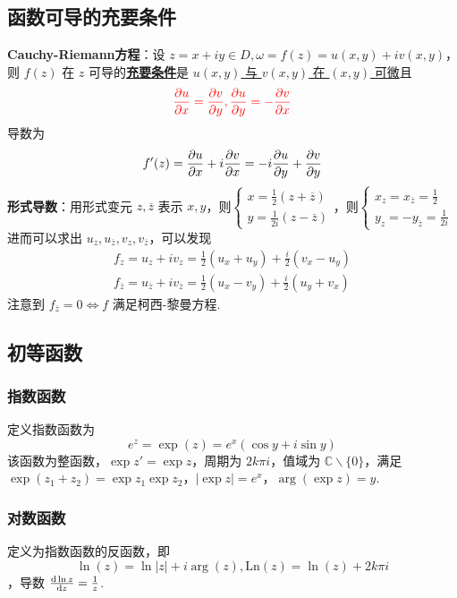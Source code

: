 \documentclass[./main.tex]{subfiles}
\begin{document}
\subsection{函数可导的充要条件}
\textbf{Cauchy-Riemann方程}：设 $z=x+iy\in D,\omega=f(z)=u(x,y)+iv(x,y)$，则 $f(z)$ 在 $z$ 可导的\underline{\textbf{充要条件}}是 \underline{$u(x,y)$ 与 $v(x,y)$ 在 $(x,y)$ 可微}且
\begin{equation}{\color{red}
    \frac{\partial u}{\partial x}=\frac{\partial v}{\partial y},\frac{\partial u}{\partial y}=-\frac{\partial v}{\partial x}    }
\end{equation}
导数为
\begin{equation}
    f'(z)=\frac{\partial u}{\partial x}+i\frac{\partial v}{\partial x}=-i\frac{\partial u}{\partial y}+\frac{\partial v}{\partial y}
\end{equation}
\indent \textbf{形式导数}：用形式变元 $z,\overline{z}$ 表示 $x,y$，则$\begin{cases}x=\frac{1}{2}(z+\overline{z})\\y=\frac{1}{2i}(z-\overline{z})\end{cases}$，则$\begin{cases}x_z=x_{\overline{z}}=\frac{1}{2}\\y_z=-y_{\overline{z}}=\frac{1}{2i}\end{cases}$ 进而可以求出 $u_z,u_{\overline{z}},v_z,v_{\overline{z}}$，可以发现
\begin{gather}
    f_z=u_z+iv_z=\frac{1}{2}(u_x+u_y)+\frac{i}{2}(v_x-u_y)\\
    f_{\overline{z}}=u_{\overline{z}}+iv_{\overline{z}}=\frac{1}{2}(u_x-v_y)+\frac{i}{2}(u_y+v_x)
\end{gather}
注意到 $f_{\overline{z}}=0\iff f$ 满足柯西-黎曼方程. 
\subsection{初等函数}
\subsubsection{指数函数}
定义指数函数为 \begin{equation}e^z=\exp(z)=e^x(\cos y+i\sin y)\end{equation}该函数为整函数，$\exp z'=\exp z$，周期为 $2k\pi i$，值域为 $\mathbb{C}\backslash\{0\}$，满足 $\exp(z_1+z_2)=\exp z_1\exp z_2$，$|\exp z|=e^x$，$\arg(\exp z)=y$. 
\subsubsection{对数函数}
定义为指数函数的反函数，即
\begin{equation}\ln(z)=\ln|z|+i\arg(z),\text{Ln}(z)=\ln(z)+2k\pi i\end{equation}，导数 $\frac{\text{d}\ln z}{\text{d}z}=\frac{1}{z}$. 
\end{document}
